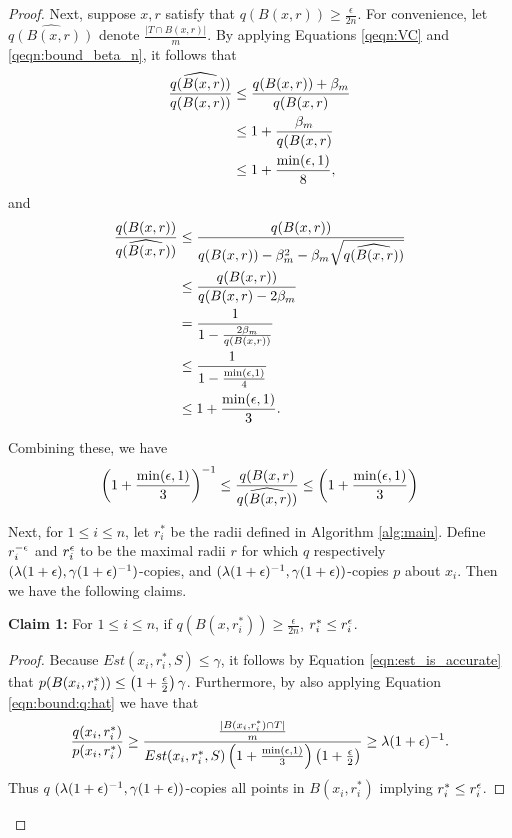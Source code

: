 \begin{proof}
Next, suppose $x, r$ satisfy that $q(B(x, r)) \geq \frac{\epsilon}{2n}$. For convenience, let $\widehat{q(B(x, r))}$ denote $\frac{|T \cap B(x, r)|}{m}$. By applying Equations \ref{qeqn:VC} and \ref{qeqn:bound_beta_n}, it follows that 
\begin{equation*}
\begin{split}
\frac{\widehat{q(B(x, r))}}{q(B(x, r))} &\leq  \frac{q(B(x, r)) + \beta_m}{q(B(x, r)}\\
&\leq 1 + \frac{\beta_m}{q(B(x, r)} \\
&\leq 1 + \frac{\min(\epsilon, 1)}{8},
\end{split}
\end{equation*}
and
\begin{equation*}
\begin{split}
\frac{q(B(x, r))}{\widehat{q(B(x, r))}} &\leq  \frac{q(B(x, r))}{q(B(x, r)) - \beta_m^2 - \beta_m\sqrt{\widehat{q(B(x, r))}}}\\
&\leq \frac{q(B(x, r))}{ q(B(x, r) - 2\beta_m} \\
&= \frac{1}{1 - \frac{2\beta_m}{q(B(x, r))}} \\
&\leq \frac{1}{1 - \frac{\min(\epsilon, 1)}{4}} \\
&\leq 1 + \frac{\min(\epsilon, 1)}{3}.
\end{split}
\end{equation*}

Combining these, we have 
\begin{equation}\label{eqn:bound:q:hat}
\left(1 + \frac{\min(\epsilon, 1)}{3}\right)^{-1} \leq \frac{q(B(x, r)}{\widehat{q(B(x, r))}} \leq \left(1 + \frac{\min(\epsilon, 1)}{3}\right)
\end{equation}

Next, for $1 \leq i \leq n$, let $r_i^*$ be the radii defined in Algorithm \ref{alg:main}. Define $r_i^{-\epsilon}$ and $r_i^{\epsilon}$ to be the maximal radii $r$ for which $q$ respectively $(\lambda(1+\epsilon), \gamma(1+\epsilon)^{-1})$-copies, and $(\lambda(1+\epsilon)^{-1}, \gamma(1+\epsilon))$-copies $p$ about $x_i$. Then we have the following claims.

\textbf{Claim 1:} For $1 \leq i \leq n$, if $q(B(x, r_i^*)) \geq \frac{\epsilon}{2n}$, $r_i^* \leq r_i^{\epsilon}$. 

\begin{proof}
Because $Est(x_i, r_i^*, S) \leq \gamma$, it follows by Equation \ref{eqn:est_is_accurate} that $p(B(x_i, r_i^*)) \leq \left(1+\frac{\epsilon}{2}\right)\gamma$. Furthermore, by also applying Equation \ref{eqn:bound:q:hat}  we have that 
\begin{equation*}
\frac{q(x_i, r_i^*)}{p(x_i, r_i^*)} \geq \frac{\frac{|B(x_i, r_i^*) \cap T|}{m}}{Est(x_i, r_i^*, S)\left(1 + \frac{\min(\epsilon, 1)}{3}\right)\left(1 + \frac{\epsilon}{2}\right)} \geq \lambda (1+\epsilon)^{-1}.
\end{equation*}
Thus $q$ $(\lambda(1+\epsilon)^{-1}, \gamma(1+\epsilon))$-copies all points in $B(x_i, r_i^*)$ implying $r_i^* \leq r_i^\epsilon$. 
\end{proof}


\end{proof}
